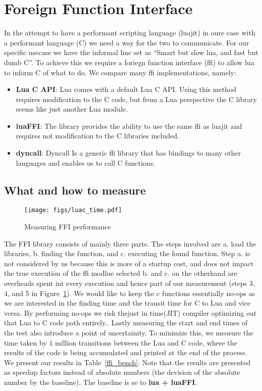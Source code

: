 \section{Foreign Function Interface}
\label{ffi}

In the attempt to have a performant scripting language (luajit) in oure case
with a performant language (C) we need a way for the two to communicate.
For our specific usecase we have the informal line set as ``Smart but slow lua,
and fast but dumb C''.
To achieve this we require a foriegn function interface (ffi) to allow lua to
inform C of what to do.
We compare many ffi implementations, namely:
\begin{itemize}
  \item {\bf Lua C API}: Lua comes with a default Lua C API. Using this method
    requires modification to the C code, but from a Lua perspective the C
    library seems like just another Lua module.
  \item {\bf luaFFI}: The library provides the ability to use the same ffi as
    luajit and requires not modification to the C libraries included.
  \item {\bf dyncall}: Dyncall\cite{dyncall} Is a generic ffi library that has
    bindings to many other languages and enables us to call C functions.  
\end{itemize}

\subsection{What and how to measure}
\begin{figure}[h]
\caption{Measuring FFI performance}
\centering
\texttt{[image: figs/luac\_time.pdf]}
\label{ffi_fig}
\end{figure} 

The FFI library consists of mainly three parts. 
The steps involved are a. load the libraries, b. finding the function, and c. executing the found function.
Step a. is not considered by us because this is more of a startup cost, and does not impact the true execution of the ffi modlue selected
 b. and c. on the otherhand are overheads spent int every execution and hence part of our measurement (steps 3, 4, and 5 in Figure~\ref{ffi_fig}).
We would like to keep the c functions essentially no-ops as we are interested in the finding time and the transit time for C to Lua and vice versa.
By performing no-ops we risk thejust in time(JIT) compiler optimizing out that Lua to C code path entirely..
Lastly measuring the start and end times of the test also introduce a point of uncertainity. To minimize this, we measure the time taken by $1$ million transitions between the Lua and C code, where the results of the code is being accumulated and printed at the end of the process.
We present our results in Table~\ref{ffi_bench}. Note that the results are presented as speedup factors instead of absolute numbers (the devision of the absolute number by the baseline). The baseline is se to {\bf lua + luaFFI}.

